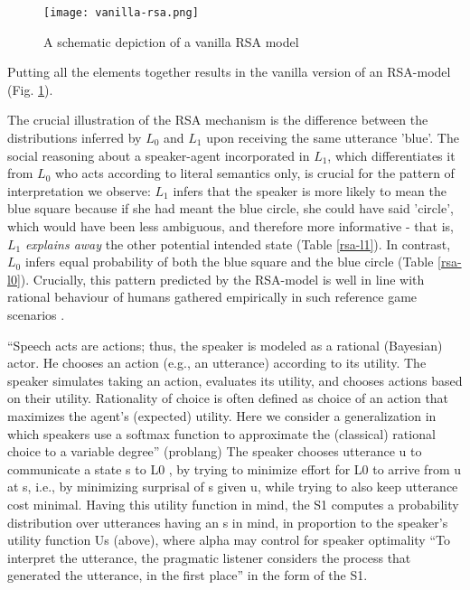 \begin{figure*}[t]
	\begin{center}
		\texttt{[image: vanilla-rsa.png]}
	\end{center}
	\vspace{-0.3cm}
	\caption{A schematic depiction of a vanilla RSA model \parencite{problang}}
	\label{vanilla-rsa}
\end{figure*}
Putting all the elements together results in the vanilla version of an RSA-model (Fig. \ref{vanilla-rsa}).

The crucial illustration of the RSA mechanism is the difference between the distributions inferred by $L_0$ and $L_1$ upon receiving the same utterance 'blue'. The social reasoning about a speaker-agent incorporated in $L_1$, which differentiates it from $L_0$ who acts according to literal semantics only, is crucial for the pattern of interpretation we observe: $L_1$ infers that the speaker is more likely to mean the blue square because if she had meant the blue circle, she could have said 'circle', which would have been less ambiguous, and therefore more informative - that is, $L_1$ \emph{explains away} the other potential intended state (Table \ref{rsa-l1}). In contrast, $L_0$ infers equal probability of both the blue square and the blue circle (Table \ref{rsa-l0}). Crucially, this pattern predicted by the RSA-model is well in line with rational behaviour of humans gathered empirically in such reference game scenarios \parencite{frank2012predicting}.

\newpage
“Speech acts are actions; thus, the speaker is modeled as a rational (Bayesian) actor. He chooses an action (e.g., an utterance) according to its utility. The speaker simulates taking an action, evaluates its utility, and chooses actions based on their utility. Rationality of choice is often defined as choice of an action that maximizes the agent’s (expected) utility. Here we consider a generalization in which speakers use a softmax function to approximate the (classical) rational choice to a variable degree” (problang)
The speaker chooses utterance u to communicate a state s to L0 , by trying to minimize effort for L0 to arrive from u at s, i.e., by minimizing surprisal of s given u, while trying to also keep utterance cost minimal. Having this utility function in mind, the S1 computes a probability distribution over utterances having an s in mind, in proportion to the speaker’s utility function Us (above), where alpha may control for speaker optimality  
“To interpret the utterance, the pragmatic listener considers the process that generated the utterance, in the first place” in the form of the S1. 



